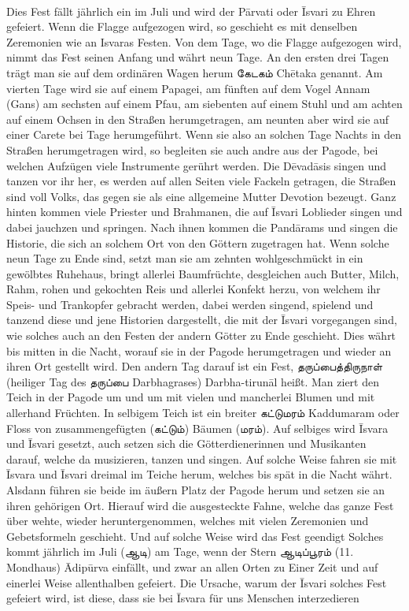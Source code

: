 \documentclass{article}
\newcommand{\TamilText}[1]{\texttamil{#1}}
\newcommand{\tam}[1]{\TamilText{#1}}
\begin{document}
\paragraph{}
Dies Fest fällt jährlich ein im Juli und wird der P\={a}rvati oder \={I}svari zu Ehren gefeiert. Wenn die Flagge aufgezogen wird, so geschieht es mit denselben Zeremonien wie an Isvaras Festen. Von dem Tage, wo die Flagge aufgezogen wird, nimmt das Fest seinen Anfang und währt neun Tage. An den ersten drei Tagen trägt man sie auf dem ordinären Wagen herum \tam{கேடகம்} Ch\={e}taka genannt. Am vierten Tage wird sie auf einem Papagei, am fünften auf dem Vogel Annam (Gans) am sechsten auf einem Pfau, am siebenten auf einem Stuhl und am achten auf einem Ochsen in den Straßen herumgetragen, am neunten aber wird sie auf einer Carete bei Tage herumgeführt. Wenn sie also an solchen Tage Nachts in den Straßen herumgetragen wird, so begleiten sie auch andre aus der Pagode, bei welchen Aufzügen viele Instrumente gerührt werden. Die D\={e}vad\={a}sis singen und tanzen vor ihr her, es werden auf allen Seiten viele Fackeln getragen, die Straßen sind voll Volks, das gegen sie als eine allgemeine Mutter Devotion bezeugt. Ganz hinten kommen viele Priester und Brahmanen, die auf \={I}svari Loblieder singen und dabei jauchzen und springen. Nach ihnen kommen die Pand\={a}rams und singen die Historie, die sich an solchem Ort von den Göttern zugetragen hat. Wenn solche neun Tage zu Ende sind, setzt man sie am zehnten wohlgeschmückt in ein gewölbtes Ruhehaus, bringt allerlei Baumfrüchte, desgleichen auch Butter, Milch, Rahm, rohen und gekochten Reis und allerlei Konfekt herzu, von welchem ihr Speis- und Trankopfer gebracht werden, dabei werden singend, spielend und tanzend diese und jene Historien dargestellt, die mit der \={I}svari vorgegangen sind, wie solches auch an den Festen der andern Götter zu Ende geschieht. Dies währt bis mitten in die Nacht, worauf sie in der Pagode herumgetragen und wieder an ihren Ort gestellt wird. Den andern Tag darauf ist ein Fest, \tam{தருப்பைத்திருநாள்} (heiliger Tag des \tam{தருப்பை} Darbhagrases) Darbha-tirun\={a}l heißt. Man ziert den Teich in der Pagode um und um mit vielen und mancherlei Blumen und mit allerhand Früchten. In selbigem Teich ist ein breiter \tam{கட்டுமரம்} Kaddumaram oder Floss von zusammengefügten (\tam{கட்டும்}) Bäumen (\tam{மரம்}). Auf selbiges wird \={I}svara und \={I}svari gesetzt, auch setzen sich die Götterdienerinnen und Musikanten darauf, welche da musizieren, tanzen und singen. Auf solche Weise fahren sie mit \={I}svara und \={I}svari dreimal im Teiche herum, welches bis spät in die Nacht währt. Alsdann führen sie beide im äußern Platz der Pagode herum und setzen sie an ihren gehörigen Ort. Hierauf wird die ausgesteckte Fahne, welche das ganze Fest über wehte, wieder heruntergenommen, welches mit vielen Zeremonien und Gebetsformeln geschieht. Und auf solche Weise wird das Fest geendigt Solches kommt jährlich im Juli (\tam{ஆடி}) am Tage, wenn der Stern \tam{ஆடிப்பூரம்} (11. Mondhaus) \={A}dip\={u}rva einfällt, und zwar an allen Orten zu Einer Zeit und auf einerlei Weise allenthalben gefeiert. Die Ursache, warum der \={I}svari solches Fest gefeiert wird, ist diese, dass sie bei \={I}svara für uns Menschen interzedieren 
\end{document}
